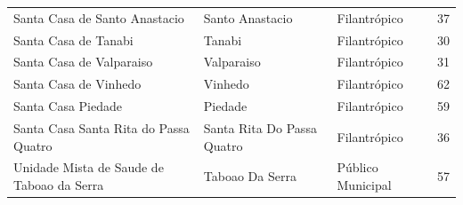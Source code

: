 {\begin{longtable}{p{}p{}lr}
Santa Casa de Santo Anastacio & Santo Anastacio & Filantrópico & 37 \\
Santa Casa de Tanabi & Tanabi & Filantrópico & 30 \\
Santa Casa de Valparaiso & Valparaiso & Filantrópico & 31 \\
Santa Casa de Vinhedo & Vinhedo & Filantrópico & 62 \\
Santa Casa Piedade & Piedade & Filantrópico & 59 \\
Santa Casa Santa Rita do Passa Quatro & Santa Rita Do Passa Quatro & Filantrópico & 36 \\
Unidade Mista de Saude de Taboao da Serra & Taboao Da Serra & Público Municipal & 57 \\
\end{longtable}}

